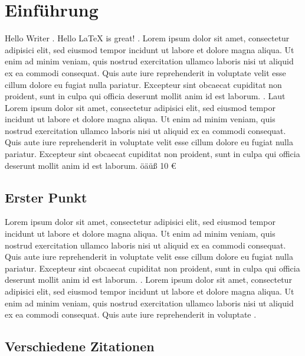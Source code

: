 \section{Einführung}
Hello Writer \cite[S. 320]{finsterwald_fostering_2013}. Hello \LaTeX{} is great! \cite{finsterwald_fostering_2013} \cite{ziegler_talent_2013}.
Lorem ipsum dolor sit amet, consectetur adipisici elit, sed eiusmod tempor incidunt ut labore et dolore magna aliqua. Ut enim ad minim veniam, quis nostrud exercitation ullamco laboris nisi ut aliquid ex ea commodi consequat. Quis aute iure reprehenderit in voluptate velit esse cillum dolore eu fugiat nulla pariatur. Excepteur sint obcaecat cupiditat non proident, sunt in culpa qui officia deserunt mollit anim id est laborum. \cite[S.34]{finsterwald_fostering_2013}. Laut  Lorem ipsum dolor sit amet, consectetur adipisici elit, sed eiusmod tempor incidunt ut labore et dolore magna aliqua. Ut enim ad minim veniam, quis nostrud exercitation ullamco laboris nisi ut aliquid ex ea commodi consequat. Quis aute iure reprehenderit in voluptate velit esse cillum dolore eu fugiat nulla pariatur. Excepteur sint obcaecat cupiditat non proident, sunt in culpa qui officia deserunt mollit anim id est laborum. \cite[S.34]{finsterwald_fostering_2013} öäüß 10 €
\subsection{Erster Punkt}
Lorem ipsum dolor sit amet, consectetur adipisici elit, sed eiusmod tempor incidunt ut labore et dolore magna aliqua. Ut enim ad minim veniam, quis nostrud exercitation ullamco laboris nisi ut aliquid ex ea commodi consequat. Quis aute iure reprehenderit in voluptate velit esse cillum dolore eu fugiat nulla pariatur. Excepteur sint obcaecat cupiditat non proident, sunt in culpa qui officia deserunt mollit anim id est laborum. \cite{zeichner_teaching_2000}. Lorem ipsum dolor sit amet, consectetur adipisici elit, sed eiusmod tempor incidunt ut labore et dolore magna aliqua. Ut enim ad minim veniam, quis nostrud exercitation ullamco laboris nisi ut aliquid ex ea commodi consequat. Quis aute iure reprehenderit in voluptate \cite{kitsantas_college_2007}.

\subsection{Verschiedene Zitationen}
\cite{abrami_using_2013}

\cite[p. 2]{heinrich_preparation_2007}


